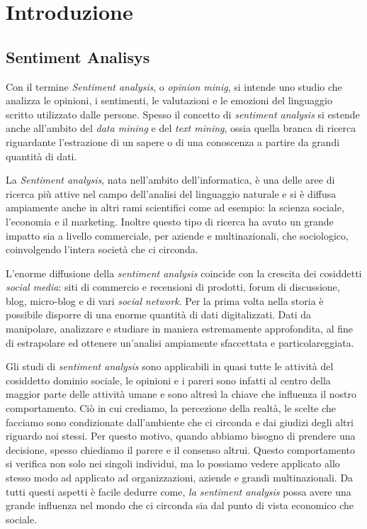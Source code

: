 \documentclass[a4paper,12pt,openright,twoside]{report}
\theoremstyle{definition}
\begin{document}
\chapter{Introduzione}

\section{Sentiment Analisys}
\label{sec:sentAnal}
Con il termine \emph{Sentiment analysis}, o \emph{opinion minig}, si intende uno studio 
che analizza le opinioni, i sentimenti, le valutazioni e le
emozioni del linguaggio scritto utilizzato dalle persone.
Spesso il concetto di \emph{sentiment analysis} si estende anche all'ambito del \emph{data mining} e
del \emph{text mining}, ossia quella branca di ricerca riguardante l'estrazione di un sapere o 
di una conoscenza a partire da grandi quantità di dati.

La \emph{Sentiment analysis}, nata nell'ambito dell'informatica, è una delle aree di ricerca più attive 
nel campo dell'analisi del linguaggio naturale e si è diffusa
ampiamente anche in altri rami scientifici come ad esempio: la scienza sociale,
l'economia e il marketing. Inoltre questo tipo di ricerca
ha avuto un grande impatto sia a livello commerciale, per aziende e multinazionali, che sociologico, 
coinvolgendo l'intera società che ci circonda.

L'enorme diffusione della \emph{sentiment analysis} coincide con la 
crescita dei cosiddetti \emph{social media}: siti di commercio e recensioni di prodotti,
forum di discussione, blog, micro-blog e di vari \emph{social network}.
Per la prima volta nella storia è possibile disporre di una
enorme quantità di dati digitalizzati. Dati da manipolare, analizzare e studiare in maniera
estremamente approfondita, al fine di estrapolare ed ottenere un'analisi
ampiamente sfaccettata e particolareggiata.

Gli studi di \emph{sentiment analysis} sono applicabili in quasi tutte
le attività del cosiddetto dominio sociale, le opinioni e i pareri 
sono infatti al centro della maggior parte delle attività umane e sono 
altresì la chiave che influenza il nostro comportamento.
Ciò in cui crediamo, la percezione della realtà, le scelte che facciamo
sono condizionate dall’ambiente che ci circonda e dai giudizi 
degli altri riguardo noi stessi.
Per questo motivo, quando abbiamo bisogno
di prendere una decisione, spesso chiediamo il parere e il consenso altrui.
Questo comportamento si verifica non solo 
nei singoli individui, ma lo possiamo  vedere applicato allo stesso modo ad
applicato ad organizzazioni, aziende e grandi multinazionali.
Da tutti questi aspetti è facile dedurre 
come, \emph{la sentiment analysis} possa avere una grande influenza nel mondo che 
ci circonda sia dal punto di vista economico che sociale.
\end{document}
